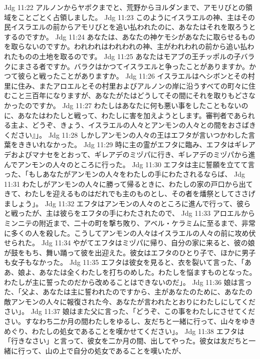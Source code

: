 Jdg 11:22  アルノンからヤボクまでと、荒野からヨルダンまで、アモリびとの領域をことごとく占領しました。
Jdg 11:23  このようにイスラエルの神、主はその民イスラエルの前からアモリびとを追い払われたのに、あなたはそれを取ろうとするのですか。
Jdg 11:24  あなたは、あなたの神ケモシがあなたに取らせるものを取らないのですか。われわれはわれわれの神、主がわれわれの前から追い払われたものの土地を取るのです。
Jdg 11:25  あなたはモアブの王チッポルの子バラクにまさる者ですか。バラクはかつてイスラエルと争ったことがありますか。かつて彼らと戦ったことがありますか。
Jdg 11:26  イスラエルはヘシボンとその村里に住み、またアロエルとその村里およびアルノンの岸に沿うすべての町々に住むこと三百年になりますが、あなたがたはどうしてその間にそれを取りもどさなかったのですか。
Jdg 11:27  わたしはあなたに何も悪い事をしたこともないのに、あなたはわたしと戦って、わたしに害を加えようとします。審判者であられる主よ、どうぞ、きょう、イスラエルの人々とアンモンの人々との間をおさばきください』」。
Jdg 11:28  しかしアンモンの人々の王はエフタが言いつかわした言葉をききいれなかった。
Jdg 11:29  時に主の霊がエフタに臨み、エフタはギレアデおよびマナセをとおって、ギレアデのミヅパに行き、ギレアデのミヅパから進んでアンモンの人々のところに行った。
Jdg 11:30  エフタは主に誓願を立てて言った、「もしあなたがアンモンの人々をわたしの手にわたされるならば、
Jdg 11:31  わたしがアンモンの人々に勝って帰るときに、わたしの家の戸口から出てきて、わたしを迎えるものはだれでも主のものとし、その者を燔祭としてささげましょう」。
Jdg 11:32  エフタはアンモンの人々のところに進んで行って、彼らと戦ったが、主は彼らをエフタの手にわたされたので、
Jdg 11:33  アロエルからミンニテの附近まで、二十の町を撃ち敗り、アベル・ケラミムに至るまで、非常に多くの人を殺した。こうしてアンモンの人々はイスラエルの人々の前に攻め伏せられた。
Jdg 11:34  やがてエフタはミヅパに帰り、自分の家に来ると、彼の娘が鼓をもち、舞い踊って彼を出迎えた。彼女はエフタのひとり子で、ほかに男子も女子もなかった。
Jdg 11:35  エフタは彼女を見ると、衣を裂いて言った、「ああ、娘よ、あなたは全くわたしを打ちのめした。わたしを悩ますものとなった。わたしが主に誓ったのだから改めることはできないのだ」。
Jdg 11:36  娘は言った、「父よ、あなたは主に誓われたのですから、主があなたのために、あなたの敵アンモンの人々に報復された今、あなたが言われたとおりにわたしにしてください」。
Jdg 11:37  娘はまた父に言った、「どうぞ、この事をわたしにさせてください。すなわち二か月の間わたしをゆるし、友だちと一緒に行って、山々をゆきめぐり、わたしの処女であることを嘆かせてください」。
Jdg 11:38  エフタは「行きなさい」と言って、彼女を二か月の間、出してやった。彼女は友だちと一緒に行って、山の上で自分の処女であることを嘆いたが、
